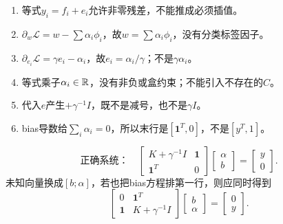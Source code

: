 \solve
\begin{enumerate}
\item 等式$y_i=f_i+e_i$允许非零残差，不能推成必须插值。
\item $\partial_w\mathcal L=w-\sum\alpha_i\phi_i$，故$w=\sum\alpha_i\phi_i$，没有分类标签因子。
\item $\partial_{e_i}\mathcal L=\gamma e_i-\alpha_i$，故$e_i=\alpha_i/\gamma$；不是$\gamma\alpha_i$。
\item 等式乘子$\alpha_i\in\mathbb{R}$，没有非负或盒约束；不能引入不存在的$C$。
\item 代入$e$产生$+\gamma^{-1}I$，既不是减号，也不是$\gamma I$。
\item bias导数给$\sum_i\alpha_i=0$，所以末行是$[\mathbf1^T,0]$，不是$[y^T,1]$。
\end{enumerate}
\[
\text{正确系统：}\quad
\begin{bmatrix}K+\gamma^{-1}I&\mathbf1\\\mathbf1^T&0\end{bmatrix}
\begin{bmatrix}\alpha\\b\end{bmatrix}=\begin{bmatrix}y\\0\end{bmatrix}.
\]
未知向量换成$[b;\alpha]$，若也把bias方程排第一行，则应同时得到
\[
\begin{bmatrix}0&\mathbf1^T\\\mathbf1&K+\gamma^{-1}I\end{bmatrix}
\begin{bmatrix}b\\\alpha\end{bmatrix}=\begin{bmatrix}0\\y\end{bmatrix}.
\]

